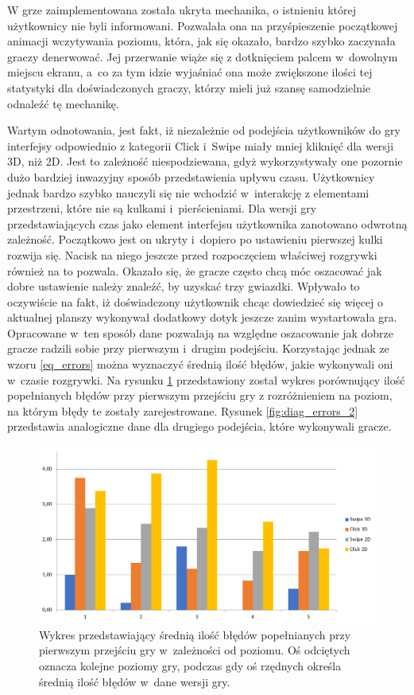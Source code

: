 \documentclass[a4paper,12pt,numbers=noenddot]{report}
\begin{document}
W grze zaimplementowana została ukryta mechanika, o istnieniu której użytkownicy nie byli informowani. Pozwalała ona na przyśpieszenie początkowej animacji wczytywania poziomu, która, jak się okazało, bardzo szybko zaczynała graczy denerwować. Jej przerwanie wiąże się z dotknięciem palcem w~dowolnym miejscu ekranu, a~co za tym idzie wyjaśniać ona może zwiększone ilości tej statystyki dla doświadczonych graczy, którzy mieli już szansę samodzielnie odnaleźć tę mechanikę.

Wartym odnotowania, jest fakt, iż niezależnie od podejścia użytkowników do gry interfejsy odpowiednio z kategorii Click i~Swipe miały mniej kliknięć dla wersji 3D, niż 2D. Jest to zależność niespodziewana, gdyż wykorzystywały one pozornie dużo bardziej inwazyjny sposób przedstawienia upływu czasu. Użytkownicy jednak bardzo szybko nauczyli się nie wchodzić w~interakcję z elementami przestrzeni, które nie są kulkami i~pierścieniami. Dla wersji gry przedstawiających czas jako element interfejsu użytkownika zanotowano odwrotną zależność. Początkowo jest on ukryty i~dopiero po ustawieniu pierwszej kulki rozwija się. Nacisk na niego jeszcze przed rozpoczęciem właściwej rozgrywki również na to pozwala. Okazało się, że gracze często chcą móc oszacować jak dobre ustawienie należy znaleźć, by uzyskać trzy gwiazdki. Wpływało to oczywiście na fakt, iż doświadczony użytkownik chcąc dowiedzieć się więcej o aktualnej planszy wykonywał dodatkowy dotyk jeszcze zanim wystartowała gra.\\

Opracowane w~ten sposób dane pozwalają na względne oszacowanie jak dobrze gracze radzili sobie przy pierwszym i~drugim podejściu. Korzystając jednak ze wzoru \ref{eq_errors} można wyznaczyć średnią ilość błędów, jakie wykonywali oni w~czasie rozgrywki. 
Na rysunku \ref{fig:diag_errors_1} przedstawiony został wykres porównujący ilość popełnianych błędów przy pierwszym przejściu gry z rozróżnieniem na poziom, na którym błędy te zostały zarejestrowane. Rysunek \ref{fig:diag_errors_2} przedstawia analogiczne dane dla drugiego podejścia, które wykonywali gracze.

\begin{figure}[h!]
	\centering
  	\includegraphics[width=\linewidth]{diag/errors_1.png}
	\caption{Wykres przedstawiający średnią ilość błędów popełnianych przy pierwszym przejściu gry w~zależności od poziomu. Oś odciętych oznacza kolejne poziomy gry, podczas gdy oś rzędnych określa średnią ilość błędów w~dane wersji gry.}
	\label{fig:diag_errors_1}
\end{figure}
\end{document}
